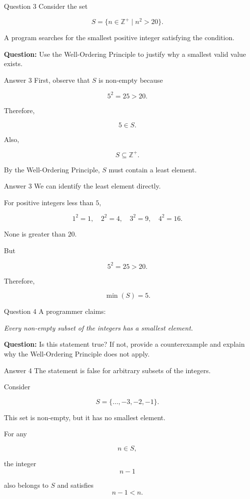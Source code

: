 
\begin{frame}{Question 3}
Consider the set

$$
S=\{n\in\mathbb{Z}^+\mid n^2>20\}.
$$

A program searches for the smallest positive integer satisfying the condition.

\textbf{Question:} Use the Well-Ordering Principle to justify why a smallest valid value exists.
\end{frame}

\begin{frame}{Answer 3}
First, observe that $S$ is non-empty because

$$
5^2=25>20.
$$

Therefore,

$$
5\in S.
$$

Also,

$$
S\subseteq\mathbb{Z}^+.
$$

By the Well-Ordering Principle, $S$ must contain a least element.
\end{frame}

\begin{frame}{Answer 3}
We can identify the least element directly.

For positive integers less than $5$,

$$
1^2=1,\quad
2^2=4,\quad
3^2=9,\quad
4^2=16.
$$

None is greater than $20$.

But

$$
5^2=25>20.
$$

Therefore,

$$
\boxed{\min(S)=5}.
$$

\end{frame}


\begin{frame}{Question 4}
A programmer claims:

\textit{Every non-empty subset of the integers has a smallest element.}

\textbf{Question:} Is this statement true? If not, provide a counterexample and explain why the Well-Ordering Principle does not apply.
\end{frame}

\begin{frame}{Answer 4}
The statement is false for arbitrary subsets of the integers.

Consider

$$
S=\{\ldots,-3,-2,-1\}.
$$

This set is non-empty, but it has no smallest element.

For any

$$
n\in S,
$$

the integer
$$
n-1
$$

also belongs to $S$ and satisfies
$$
n-1<n.
$$

\end{frame}

